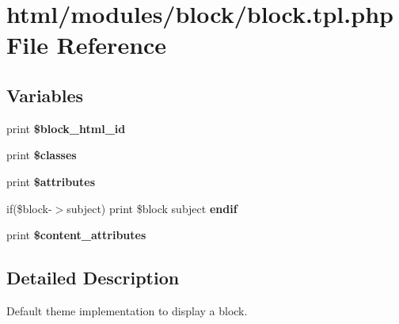 \hypertarget{block_8tpl_8php}{
\section{html/modules/block/block.tpl.php File Reference}
\label{block_8tpl_8php}
}
\subsection*{Variables}
\begin{DoxyCompactItemize}
\item 
\hypertarget{block_8tpl_8php_a1d314df26c9d2df18cfcb1d3b547fba2}{
print {\bfseries \$block\_\-html\_\-id}}
\label{block_8tpl_8php_a1d314df26c9d2df18cfcb1d3b547fba2}

\item 
\hypertarget{block_8tpl_8php_a6d48ecbdbc70ca1812e665169b5fa1e2}{
print {\bfseries \$classes}}
\label{block_8tpl_8php_a6d48ecbdbc70ca1812e665169b5fa1e2}

\item 
\hypertarget{block_8tpl_8php_a9c88c4272fa40546577b45392a0b3cd3}{
print {\bfseries \$attributes}}
\label{block_8tpl_8php_a9c88c4272fa40546577b45392a0b3cd3}

\item 
\hypertarget{block_8tpl_8php_a1402cc2f36f7cc1ad42eb00e08222d7d}{
if(\$block-\/$>$subject) print \$block subject {\bfseries endif}}
\label{block_8tpl_8php_a1402cc2f36f7cc1ad42eb00e08222d7d}

\item 
\hypertarget{block_8tpl_8php_ae2ee2e16f11937564281332a76a658e8}{
print {\bfseries \$content\_\-attributes}}
\label{block_8tpl_8php_ae2ee2e16f11937564281332a76a658e8}

\end{DoxyCompactItemize}


\subsection{Detailed Description}
Default theme implementation to display a block.

